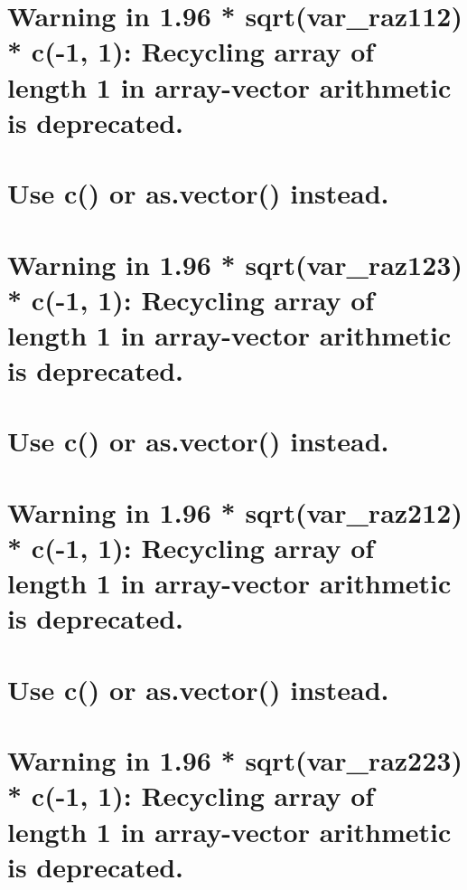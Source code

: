 \documentclass[]{book}
\theoremstyle{definition}
\theoremstyle{definition}
\theoremstyle{definition}
\theoremstyle{remark}
\begin{document}
\section{Warning in 1.96 * sqrt(var\_raz112) * c(-1, 1): Recycling array
of length 1 in array-vector arithmetic is
deprecated.}\label{warning-in-1.96-sqrtvar_raz112-c-1-1-recycling-array-of-length-1-in-array-vector-arithmetic-is-deprecated.}

\section{Use c() or as.vector()
instead.}\label{use-c-or-as.vector-instead.}

\section{Warning in 1.96 * sqrt(var\_raz123) * c(-1, 1): Recycling array
of length 1 in array-vector arithmetic is
deprecated.}\label{warning-in-1.96-sqrtvar_raz123-c-1-1-recycling-array-of-length-1-in-array-vector-arithmetic-is-deprecated.}

\section{Use c() or as.vector()
instead.}\label{use-c-or-as.vector-instead.-1}

\section{Warning in 1.96 * sqrt(var\_raz212) * c(-1, 1): Recycling array
of length 1 in array-vector arithmetic is
deprecated.}\label{warning-in-1.96-sqrtvar_raz212-c-1-1-recycling-array-of-length-1-in-array-vector-arithmetic-is-deprecated.}

\section{Use c() or as.vector()
instead.}\label{use-c-or-as.vector-instead.-2}

\section{Warning in 1.96 * sqrt(var\_raz223) * c(-1, 1): Recycling array
of length 1 in array-vector arithmetic is
deprecated.}\label{warning-in-1.96-sqrtvar_raz223-c-1-1-recycling-array-of-length-1-in-array-vector-arithmetic-is-deprecated.}
\end{document}
